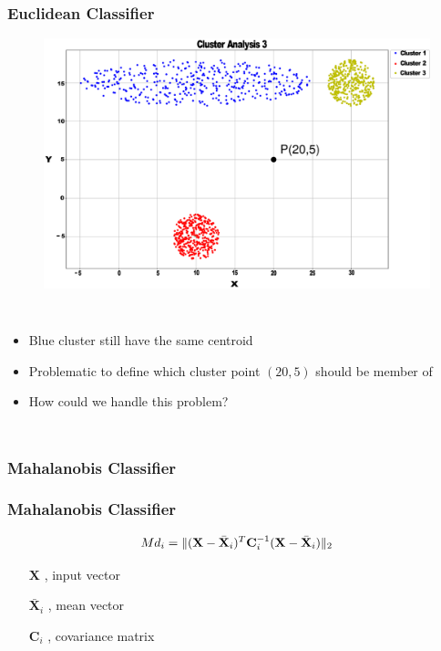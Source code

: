 \documentclass[aspectratio=10]{beamer} %
\begin{document}
\begin{frame}
\frametitle{Euclidean Classifier}
\begin{figure}[H]
	\includegraphics[scale=0.12]{Imagens/clusteranalise3.eps}
\end{figure}

    \begin{columns}
    	\footnotesize
    	\justifying
\begin{itemize}
	\item Blue cluster still have the same centroid
	\pause 
	\item Problematic to define which cluster point $(20,5)$ should be member of 
	\pause
	\item How could we handle this problem?
\end{itemize}
\end{columns}
\end{frame}

\subsubsection{Mahalanobis Classifier}

\begin{frame}
	\frametitle{Mahalanobis Classifier}
	\begin{tcolorbox}[colback=gray!5,colframe=blue!40!black,title=Definition]
	  \begin{equation}
			Md_{i}=\Arrowvert(\textbf{X}-\bar{\textbf{X}}_{i})^{T}\textbf{C}_{i}^{-1}(\textbf{X}-\bar{\textbf{X}}_{i})\Arrowvert_{2}\nonumber
			\label{eq5}
		\end{equation}
	\end{tcolorbox}
	 \pause
	\begin{itemize}
		\centering
    	\item[$\textbf{X}$], input vector 
		\pause
		\item[$\bar{\textbf{X}}_{i}$], mean vector
		\pause
		\item[$\textbf{C}_{i}$], covariance matrix
	\end{itemize}
\end{frame}
\end{document}
